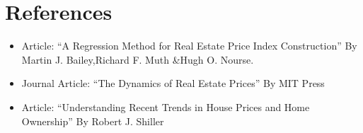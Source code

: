 \documentclass[
]{article}
\begin{document}
\hypertarget{references}{%
\section{References}\label{references}}

\begin{itemize}
\item
  Article: ``A Regression Method for Real Estate Price Index
  Construction'' By Martin J. Bailey,Richard F. Muth \&Hugh O. Nourse.
\item
  Journal Article: ``The Dynamics of Real Estate Prices'' By MIT Press
\item
  Article: ``Understanding Recent Trends in House Prices and Home
  Ownership'' By Robert J. Shiller
\end{itemize}
\end{document}
